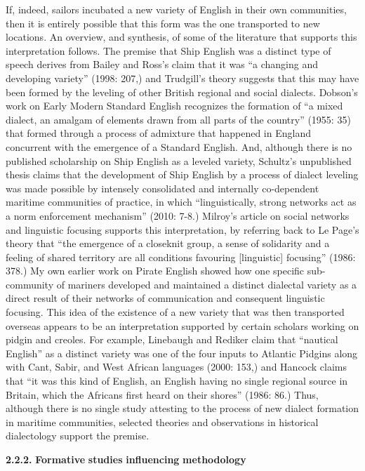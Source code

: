 If, indeed, sailors incubated a new variety of English in their own communities, then it is entirely possible that this form was the one transported to new locations. An overview, and synthesis, of some of the literature that supports this interpretation follows. The premise that Ship English was a distinct type of speech derives from Bailey and Ross’s claim that it was “a changing and developing variety” (1998: 207,) and Trudgill’s theory suggests that this may have been formed by the leveling of other British regional and social dialects. Dobson’s work on Early Modern Standard English recognizes the formation of “a mixed dialect, an amalgam of elements drawn from all parts of the country” (1955: 35) that formed through a process of admixture that happened in England concurrent with the emergence of a Standard English. And, although there is no published scholarship on Ship English as a leveled variety, Schultz’s unpublished thesis claims that the development of Ship English by a process of dialect leveling was made possible by intensely consolidated and internally co-dependent maritime communities of practice, in which “linguistically, strong networks act as a norm enforcement mechanism” (2010: 7-8.) Milroy’s article on social networks and linguistic focusing  supports this interpretation, by referring back to Le Page’s theory that “the emergence of a closeknit group, a sense of solidarity and a feeling of shared territory are all conditions favouring [linguistic] focusing” (1986: 378.) My own earlier work on Pirate English \citep{Delgado2013} showed how one specific sub-community of mariners developed and maintained a distinct dialectal variety as a direct result of their networks of communication and consequent linguistic focusing. This idea of the existence of a new variety that was then transported overseas appears to be an interpretation supported by certain scholars working on pidgin and creoles.  For example, Linebaugh and Rediker claim that “nautical English” as a distinct variety was one of the four inputs to Atlantic Pidgins along with Cant, Sabir, and West African languages (2000: 153,) and Hancock claims that “it was this kind of English, an English having no single regional source in Britain, which the Africans first heard on their shores” (1986: 86.) Thus, although there is no single study attesting to the process of new dialect formation in maritime communities, selected theories and observations in historical dialectology support the premise. 

  \textbf{2.2.2.} \textbf{Formative} \textbf{studies} \textbf{influencing} \textbf{methodology}

